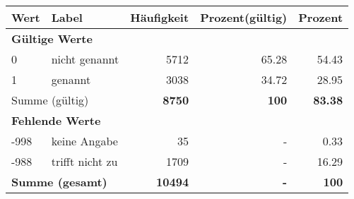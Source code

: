     \begin{longtable}{lXrrr}
     \toprule
     \textbf{Wert} & \textbf{Label} & \textbf{Häufigkeit} & \textbf{Prozent(gültig)} & \textbf{Prozent} \\
     \endhead
     \midrule
     \multicolumn{5}{l}{\textbf{Gültige Werte}}\\

     0 &
     \multicolumn{1}{X}{ nicht genannt   } &


       \num{5712} &
       \num[round-mode=places,round-precision=2]{65,28} &
         \num[round-mode=places,round-precision=2]{54,43} \\

     1 &
     \multicolumn{1}{X}{ genannt   } &


       \num{3038} &
       \num[round-mode=places,round-precision=2]{34,72} &
         \num[round-mode=places,round-precision=2]{28,95} \\
     \midrule
     \multicolumn{2}{l}{Summe (gültig)} &
       \textbf{\num{8750}} &
     \textbf{100} &
       \textbf{\num[round-mode=places,round-precision=2]{83,38}} \\
     \multicolumn{5}{l}{\textbf{Fehlende Werte}}\\
       -998 &
       keine Angabe &
         \num{35} &
        - &
         \num[round-mode=places,round-precision=2]{0,33} \\
       -988 &
       trifft nicht zu &
         \num{1709} &
        - &
         \num[round-mode=places,round-precision=2]{16,29} \\
     \midrule
     \multicolumn{2}{l}{\textbf{Summe (gesamt)}} &
          \textbf{\num{10494}} &
        \textbf{-} &
        \textbf{100} \\
     \bottomrule
     \end{longtable}
     
